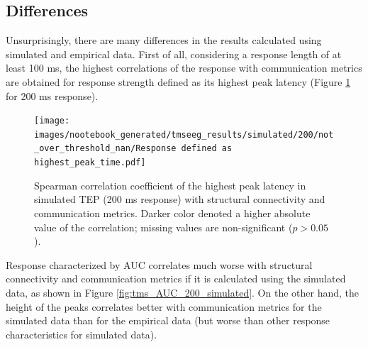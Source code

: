 \subsection{Differences}

Unsurprisingly, there are many differences in the results calculated using simulated and empirical data. First of all, considering a response length of at least 100 ms, the highest correlations of the response with communication metrics are obtained for response strength defined as its highest peak latency (Figure \ref{fig:tms_highest_time_200_simulated} for 200 ms response).

\begin{figure}
    \centering
    \texttt{[image: images/nootebook\_generated/tmseeg\_results/simulated/200/not\_over\_threshold\_nan/Response defined as highest\_peak\_time.pdf]}
    \caption[TEPs highest peak latency (200 ms) correlations (simulated data)]{Spearman correlation coefficient of the highest peak latency in simulated TEP (200 ms response) with structural connectivity and communication metrics. Darker color denoted a higher absolute value of the correlation; missing values are non-significant ($p>0.05$).}
    \label{fig:tms_highest_time_200_simulated}
\end{figure}

Response characterized by AUC correlates much worse with structural connectivity and communication metrics if it is calculated using the simulated data, as shown in Figure \ref{fig:tms_AUC_200_simulated}. On the other hand, the height of the peaks correlates better with communication metrics for the simulated data than for the empirical data (but worse than other response characteristics for simulated data). 

